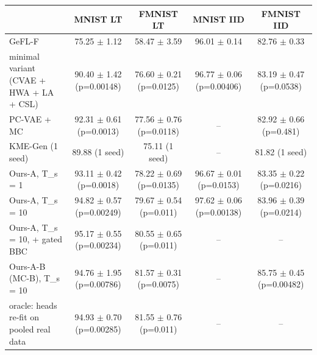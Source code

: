 \begin{tabular}{lcccc}
\toprule
 & MNIST LT & FMNIST LT & MNIST IID & FMNIST IID \\
\midrule
GeFL-F & 75.25 $\pm$ 1.12 & 58.47 $\pm$ 3.59 & 96.01 $\pm$ 0.14 & 82.76 $\pm$ 0.33 \\
minimal variant (CVAE + HWA + LA + CSL) & 90.40 $\pm$ 1.42 (p=0.00148) & 76.60 $\pm$ 0.21 (p=0.0125) & 96.77 $\pm$ 0.06 (p=0.00406) & 83.19 $\pm$ 0.47 (p=0.0538) \\
PC-VAE + MC & 92.31 $\pm$ 0.61 (p=0.0013) & 77.56 $\pm$ 0.76 (p=0.0118) & -- & 82.92 $\pm$ 0.66 (p=0.481) \\
KME-Gen (1 seed) & 89.88 (1 seed) & 75.11 (1 seed) & -- & 81.82 (1 seed) \\
Ours-A, T\_s = 1 & 93.11 $\pm$ 0.42 (p=0.0018) & 78.22 $\pm$ 0.69 (p=0.0135) & 96.67 $\pm$ 0.01 (p=0.0153) & 83.35 $\pm$ 0.22 (p=0.0216) \\
Ours-A, T\_s = 10 & 94.82 $\pm$ 0.57 (p=0.00249) & 79.67 $\pm$ 0.54 (p=0.011) & 97.62 $\pm$ 0.06 (p=0.00138) & 83.96 $\pm$ 0.39 (p=0.0214) \\
Ours-A, T\_s = 10, + gated BBC & 95.17 $\pm$ 0.55 (p=0.00234) & 80.55 $\pm$ 0.65 (p=0.011) & -- & -- \\
Ours-A-B (MC-B), T\_s = 10 & 94.76 $\pm$ 1.95 (p=0.00786) & 81.57 $\pm$ 0.31 (p=0.0075) & -- & 85.75 $\pm$ 0.45 (p=0.00482) \\
oracle: heads re-fit on pooled real data & 94.93 $\pm$ 0.70 (p=0.00285) & 81.55 $\pm$ 0.76 (p=0.011) & -- & -- \\
\bottomrule
\end{tabular}
